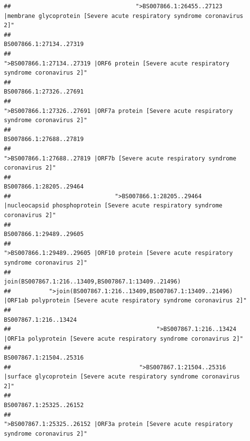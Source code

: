 \documentclass[
]{article}
\begin{document}
\begin{verbatim}
##                                    ">BS007866.1:26455..27123 |membrane glycoprotein [Severe acute respiratory syndrome coronavirus 2]" 
##                                                                                                                BS007866.1:27134..27319 
##                                             ">BS007866.1:27134..27319 |ORF6 protein [Severe acute respiratory syndrome coronavirus 2]" 
##                                                                                                                BS007866.1:27326..27691 
##                                            ">BS007866.1:27326..27691 |ORF7a protein [Severe acute respiratory syndrome coronavirus 2]" 
##                                                                                                                BS007866.1:27688..27819 
##                                                    ">BS007866.1:27688..27819 |ORF7b [Severe acute respiratory syndrome coronavirus 2]" 
##                                                                                                                BS007866.1:28205..29464 
##                              ">BS007866.1:28205..29464 |nucleocapsid phosphoprotein [Severe acute respiratory syndrome coronavirus 2]" 
##                                                                                                                BS007866.1:29489..29605 
##                                            ">BS007866.1:29489..29605 |ORF10 protein [Severe acute respiratory syndrome coronavirus 2]" 
##                                                                                    join(BS007867.1:216..13409,BS007867.1:13409..21496) 
##           ">join(BS007867.1:216..13409,BS007867.1:13409..21496) |ORF1ab polyprotein [Severe acute respiratory syndrome coronavirus 2]" 
##                                                                                                                  BS007867.1:216..13424 
##                                          ">BS007867.1:216..13424 |ORF1a polyprotein [Severe acute respiratory syndrome coronavirus 2]" 
##                                                                                                                BS007867.1:21504..25316 
##                                     ">BS007867.1:21504..25316 |surface glycoprotein [Severe acute respiratory syndrome coronavirus 2]" 
##                                                                                                                BS007867.1:25325..26152 
##                                            ">BS007867.1:25325..26152 |ORF3a protein [Severe acute respiratory syndrome coronavirus 2]" 

\end{verbatim}
\end{document}
